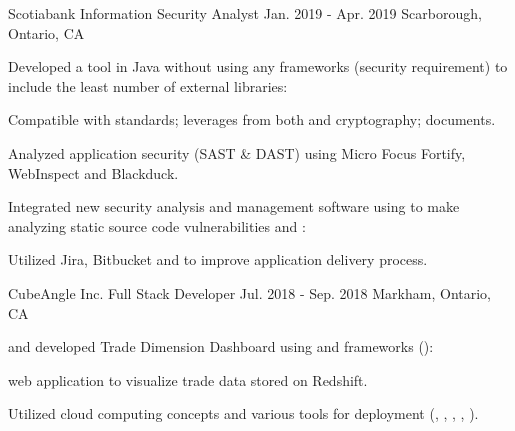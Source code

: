 \begin{cventries}
  \cventry
    {Scotiabank} %
    {Information Security Analyst} %
    {Jan. 2019 - Apr. 2019} %
    {Scarborough, Ontario, CA} %
    {
      \begin{cvitems} %
        \item {Developed a  tool in Java without using any frameworks (security requirement) to include the least number of external libraries:}
          \begin{cvsubitems}
            \item {Compatible with  standards; leverages from both  and  cryptography;  documents.}
          \end{cvsubitems}
        \item {Analyzed application security (SAST \& DAST) using Micro Focus Fortify, WebInspect and Blackduck.}
        \item {Integrated new security analysis and management software using  to make analyzing static source code vulnerabilities  and :}
          \begin{cvsubitems}
            \item {Utilized Jira, Bitbucket and  to improve application delivery process.}
          \end{cvsubitems}
      \end{cvitems}
    }

  \cventry
    {CubeAngle Inc.} %
    {Full Stack Developer} %
    {Jul. 2018 - Sep. 2018} %
    {Markham, Ontario, CA} %
    {
      \begin{cvitems} %
        \item { and developed Trade Dimension Dashboard using  and  frameworks ():}
          \begin{cvsubitems}
            \item { web application to visualize trade data stored on  Redshift.}
          \end{cvsubitems}
        \item {Utilized cloud computing concepts and various  tools for deployment (, , , , ).}
      \end{cvitems}
    }


\end{cventries}

